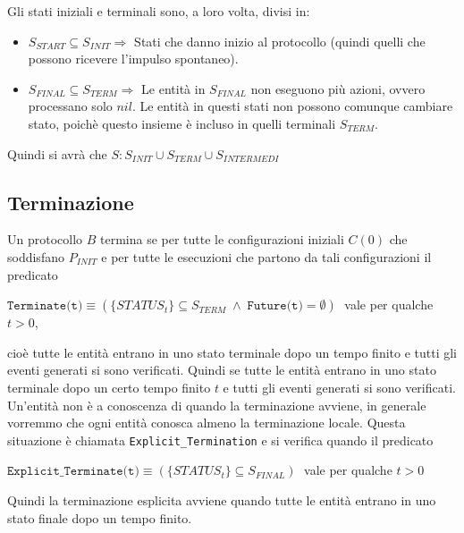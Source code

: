 Gli stati iniziali e terminali sono, a loro volta, divisi in:
\begin{itemize}
    \item $S_{START}\subseteq S_{INIT} \Rightarrow$ Stati che danno inizio al
          protocollo (quindi quelli che possono ricevere l'impulso spontaneo).
    \item $S_{FINAL}\subseteq S_{TERM} \Rightarrow$ Le entità in $S_{FINAL}$ non
          eseguono più azioni, ovvero processano solo $nil$. Le entità in questi stati
          non possono comunque cambiare stato, poichè questo insieme è incluso in quelli
          terminali $S_{TERM}$.
\end{itemize}

Quindi si avrà che $S: S_{INIT} \cup S_{TERM} \cup S_{INTERMEDI}$

\subsection{Terminazione}
Un protocollo $B$ termina se per tutte le configurazioni iniziali $C(0)$ che
soddisfano $P_{INIT}$ e per tutte le esecuzioni che partono da tali
configurazioni il predicato
\begin{center}
    $\texttt{Terminate(t)} \equiv (\{STATUS_t\} \subseteq S_{TERM} \; \wedge \;
        \texttt{Future(t)} = \emptyset) \;$ vale per qualche \; $t>0$,
\end{center}
cioè tutte le entità entrano in uno stato terminale dopo un tempo finito e tutti
gli eventi generati si sono verificati. Quindi se tutte le entità entrano in uno
stato terminale dopo un certo tempo finito $t$ e tutti gli eventi generati si
sono verificati.\\
Un'entità non è a conoscenza di quando la terminazione avviene, in generale
vorremmo che ogni entità conosca almeno la terminazione locale. Questa
situazione è chiamata \verb|Explicit_Termination| e si verifica quando il predicato

\begin{center}
    $\texttt{Explicit\_Terminate(t)} \equiv (\{STATUS_t\} \subseteq S_{FINAL}) \;$
    vale per qualche $t>0$
\end{center}
Quindi la terminazione esplicita avviene quando tutte le entità entrano in uno
stato finale dopo un tempo finito.


